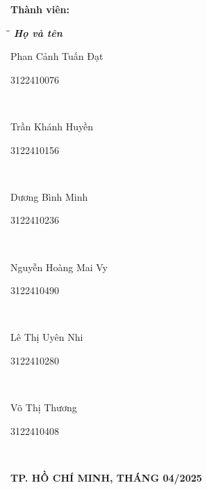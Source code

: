 \documentclass[a4paper,12pt]{report}
\begin{document}
\begin{titlepage}
    \vspace{10pt}
    \textbf{Thành viên:}
    \begin{tabbing}
        \hspace{8cm}\=\hspace{3cm}\=\hspace{3cm} \kill
        {\it \textbf{Họ và tên}}\\
        \begin{bfseries}Phan Cảnh Tuấn Đạt\end{bfseries}\> \begin{bfseries}3122410076\end{bfseries}\\
        \begin{bfseries}Trần Khánh Huyền\end{bfseries}\> \begin{bfseries}3122410156\end{bfseries}\\
        \begin{bfseries}Dương Bình Minh\end{bfseries}\> \begin{bfseries}3122410236\end{bfseries}\\
        \begin{bfseries}Nguyễn Hoàng Mai Vy\end{bfseries}\> \begin{bfseries}3122410490\end{bfseries}\\
        \begin{bfseries}Lê Thị Uyên Nhi\end{bfseries}\> \begin{bfseries}3122410280\end{bfseries}\\
        \begin{bfseries}Võ Thị Thương\end{bfseries}\> \begin{bfseries}3122410408\end{bfseries}\\

    \end{tabbing}
    \vspace{60pt}
    \begin{center}
        \textbf{TP. HỒ CHÍ MINH, THÁNG 04/2025}
    \end{center}
\end{titlepage}
\newpage
\thispagestyle{empty} %
\mbox{} %
\newpage
\setcounter{page}{1} %
\newpage
\end{document}
